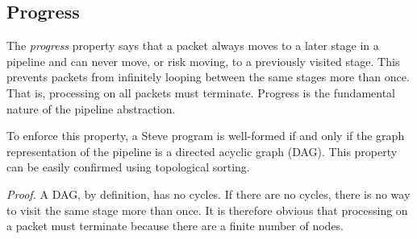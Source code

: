 \subsection{Progress} \label{guide:progress}

The \textit{progress} property says that a packet always moves to a later stage in a pipeline and can never move, or risk moving, to a previously visited stage.
This prevents packets from infinitely looping between the same stages more than once. That is, processing on all packets must terminate.
Progress is the fundamental nature of the pipeline abstraction. 

To enforce this property, a Steve program is well-formed if and only if the graph representation of the pipeline is a directed acyclic graph (DAG). This property can be easily confirmed using topological sorting.

\textit{Proof.} A DAG, by definition, has no cycles. If there are no cycles, there is no way to visit the same stage more than once. It is therefore obvious that processing on a packet must terminate because there are a finite number of nodes.

%
%

